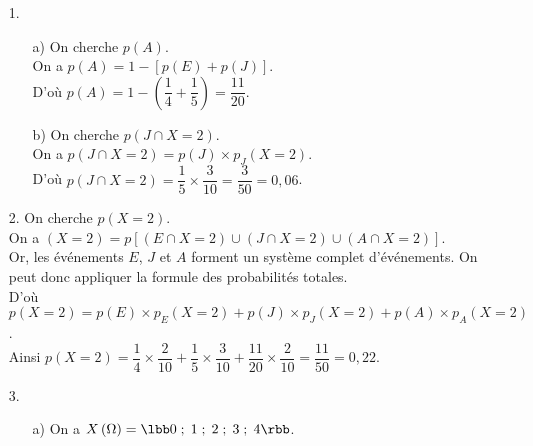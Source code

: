 \vspace*{.3cm}

\begin{itemize}
\item[1.]
\begin{itemize}
\item[a)] On cherche $p\left(A\right)$. \\

On a $p\left(A\right) = 1 - \left[p\left(E\right) + p\left(J\right)\right]$. \\

D'où $p\left(A\right) = 1 - \left(\dfrac{1}{4} + \dfrac{1}{5}\right) = \dfrac{11}{20}$. \\

\item[b)] On cherche $p\left(J \cap X = 2\right)$. \\

On a $p\left(J \cap X = 2\right) = p\left(J\right) \times p_J\left(X = 2\right)$. \\

D'où $p\left(J \cap X = 2\right) = \dfrac{1}{5} \times \dfrac{3}{10} = \dfrac{3}{50} = 0,06$. \\

\end{itemize}
\item[2.] On cherche $p\left(X = 2\right)$. \\

On a $\left(X = 2\right) = p\left[\left(E \cap X = 2\right) \cup \left(J \cap X = 2\right) \cup \left(A \cap X = 2\right) \right]$. \\

Or, les événements $E$, $J$ et $A$ forment un système complet d'événements. On peut donc appliquer la formule des probabilités totales. \\

D'où $p\left(X = 2\right) = p\left(E\right) \times p_E\left(X = 2\right) + p\left(J\right) \times p_J\left(X = 2\right) + p\left(A\right) \times p_A\left(X = 2\right)$. \\

Ainsi $p\left(X = 2\right) = \dfrac{1}{4} \times \dfrac{2}{10} + \dfrac{1}{5} \times \dfrac{3}{10} + \dfrac{11}{20} \times \dfrac{2}{10} = \dfrac{11}{50} = 0,22$. \\

\item[3.]
\begin{itemize}
\item[a)] On a $X\left(\Omega\right) = \lbb 0 \; ; \; 1 \; ; \; 2 \; ; \; 3 \; ; \; 4\rbb$. \\


\end{itemize}
\end{itemize}
